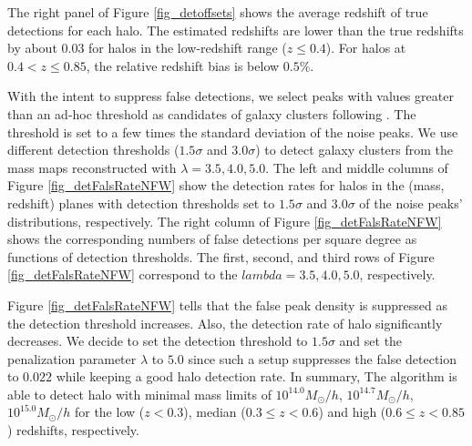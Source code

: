 The right panel of Figure \ref{fig_detoffsets} shows the average redshift of
true detections for each halo. The estimated redshifts are lower than the true
redshifts by about $0.03$ for halos in the low-redshift range ($z\leq
0.4$).  For halos at $0.4<z\leq 0.85$, the relative redshift bias is below
$0.5\%$.

With the intent to suppress false detections, we select peaks with values
greater than an ad-hoc threshold as candidates of galaxy clusters following
\citet{WL-massMap-clusDet-HSC-Miyazaki2018}.  The threshold is set to a few
times the standard deviation of the noise peaks. We use different detection
thresholds ($1.5\sigma$ and $3.0\sigma$) to detect galaxy clusters from the
mass maps reconstructed with $\lambda=3.5,4.0,5.0$. The left and middle columns
of Figure \ref{fig_detFalsRateNFW} show the detection rates for halos in the
(mass, redshift) planes with detection thresholds set to $1.5\sigma$ and
$3.0\sigma$ of the noise peaks' distributions, respectively.  The right column
of Figure \ref{fig_detFalsRateNFW} shows the corresponding numbers of false
detections per square degree as functions of detection thresholds. The first,
second, and third rows of Figure \ref{fig_detFalsRateNFW} correspond to the
$lambda=3.5,4.0,5.0$, respectively.

Figure \ref{fig_detFalsRateNFW} tells that the false peak density is suppressed
as the detection threshold increases. Also, the detection rate of halo
significantly decreases. We decide to set the detection threshold to
$1.5\sigma$ and set the penalization parameter $\lambda$ to $5.0$ since such a
setup suppresses the false detection to $0.022$ while keeping a good halo
detection rate. In summary, The algorithm is able to detect halo with minimal
mass limits of $10^{14.0} M_{\odot}/h$, $10^{14.7} M_{\odot}/h$, $10^{15.0}
M_{\odot}/h$ for the low ($z<0.3$), median ($0.3\leq z< 0.6$) and high
($0.6\leq z< 0.85$) redshifts, respectively.

